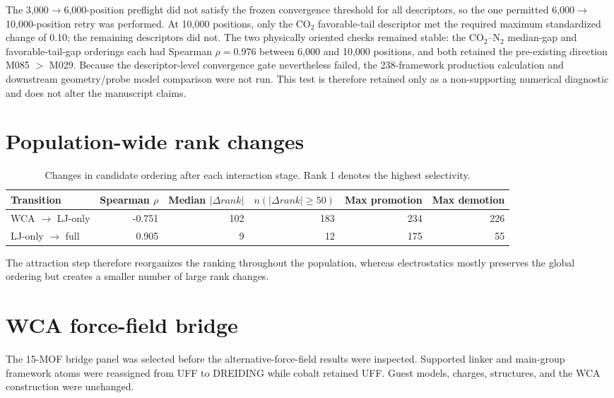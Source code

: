 \documentclass[11pt,a4paper]{article}
\begin{document}
The 3,000$\rightarrow$6,000-position preflight did not satisfy the frozen convergence threshold for all descriptors, so the one permitted 6,000$\rightarrow$10,000-position retry was performed. At 10,000 positions, only the CO$_2$ favorable-tail descriptor met the required maximum standardized change of 0.10; the remaining descriptors did not. The two physically oriented checks remained stable: the CO$_2$--N$_2$ median-gap and favorable-tail-gap orderings each had Spearman $\rho=0.976$ between 6,000 and 10,000 positions, and both retained the pre-existing direction M085 $>$ M029. Because the descriptor-level convergence gate nevertheless failed, the 238-framework production calculation and downstream geometry/probe model comparison were not run. This test is therefore retained only as a non-supporting numerical diagnostic and does not alter the manuscript claims.

\section{Population-wide rank changes}

\begin{table}[H]
\centering
\caption{Changes in candidate ordering after each interaction stage. Rank 1 denotes the highest selectivity.}
\begin{tabular}{lrrrrr}
\toprule
Transition & Spearman $\rho$ & Median $|\Delta rank|$ & $n(|\Delta rank|\geq50)$ & Max promotion & Max demotion\\
\midrule
WCA $\rightarrow$ LJ-only & -0.751 & 102 & 183 & 234 & 226\\
LJ-only $\rightarrow$ full & 0.905 & 9 & 12 & 175 & 55\\
\bottomrule
\end{tabular}
\end{table}

The attraction step therefore reorganizes the ranking throughout the population, whereas electrostatics mostly preserves the global ordering but creates a smaller number of large rank changes.

\section{WCA force-field bridge}

The 15-MOF bridge panel was selected before the alternative-force-field results were inspected. Supported linker and main-group framework atoms were reassigned from UFF to DREIDING while cobalt retained UFF. Guest models, charges, structures, and the WCA construction were unchanged.
\end{document}
